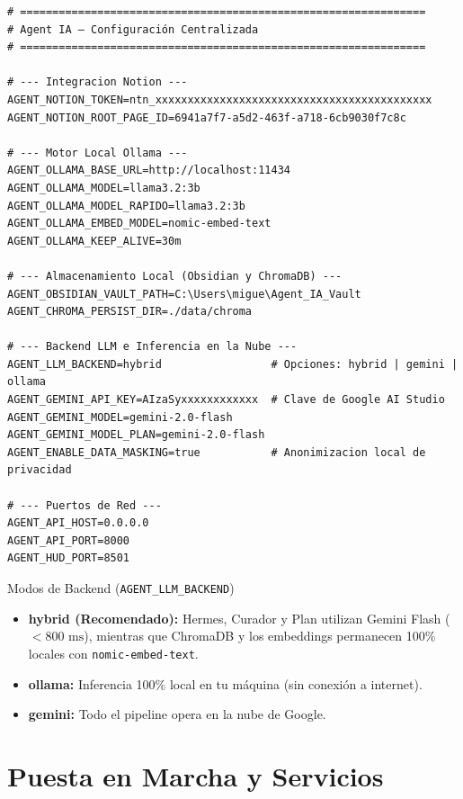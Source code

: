 \documentclass[11pt,a4paper]{article}
\begin{document}
\begin{lstlisting}[caption={Estructura completa de configuración en .env}]
# ===============================================================
# Agent IA — Configuración Centralizada
# ===============================================================

# --- Integracion Notion ---
AGENT_NOTION_TOKEN=ntn_xxxxxxxxxxxxxxxxxxxxxxxxxxxxxxxxxxxxxxxxxxx
AGENT_NOTION_ROOT_PAGE_ID=6941a7f7-a5d2-463f-a718-6cb9030f7c8c

# --- Motor Local Ollama ---
AGENT_OLLAMA_BASE_URL=http://localhost:11434
AGENT_OLLAMA_MODEL=llama3.2:3b
AGENT_OLLAMA_MODEL_RAPIDO=llama3.2:3b
AGENT_OLLAMA_EMBED_MODEL=nomic-embed-text
AGENT_OLLAMA_KEEP_ALIVE=30m

# --- Almacenamiento Local (Obsidian y ChromaDB) ---
AGENT_OBSIDIAN_VAULT_PATH=C:\Users\migue\Agent_IA_Vault
AGENT_CHROMA_PERSIST_DIR=./data/chroma

# --- Backend LLM e Inferencia en la Nube ---
AGENT_LLM_BACKEND=hybrid                 # Opciones: hybrid | gemini | ollama
AGENT_GEMINI_API_KEY=AIzaSyxxxxxxxxxxxx  # Clave de Google AI Studio
AGENT_GEMINI_MODEL=gemini-2.0-flash
AGENT_GEMINI_MODEL_PLAN=gemini-2.0-flash
AGENT_ENABLE_DATA_MASKING=true           # Anonimizacion local de privacidad

# --- Puertos de Red ---
AGENT_API_HOST=0.0.0.0
AGENT_API_PORT=8000
AGENT_HUD_PORT=8501
\end{lstlisting}

\begin{infobox}{Modos de Backend (\texttt{AGENT\_LLM\_BACKEND})}
\begin{itemize}
    \item \textbf{hybrid (Recomendado):} Hermes, Curador y Plan utilizan Gemini Flash ($<800\text{ ms}$), mientras que ChromaDB y los embeddings permanecen 100\% locales con \texttt{nomic-embed-text}.
    \item \textbf{ollama:} Inferencia 100\% local en tu máquina (sin conexión a internet).
    \item \textbf{gemini:} Todo el pipeline opera en la nube de Google.
\end{itemize}
\end{infobox}

\section{Puesta en Marcha y Servicios}
\end{document}
